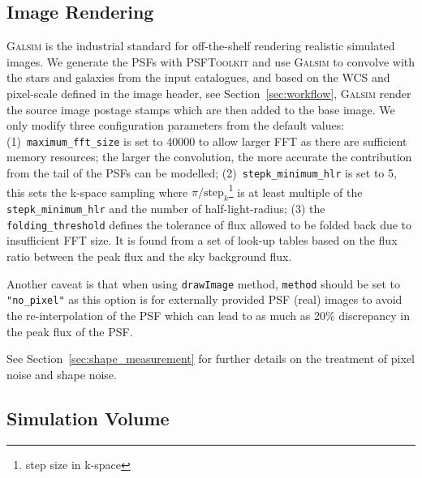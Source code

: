 \documentclass[11pt]{EuclidVIS}
\numberwithin{table}{section}
\numberwithin{figure}{section}
\begin{document}
\subsection{Image Rendering}
\textsc{Galsim} is the industrial standard for off-the-shelf rendering realistic simulated images.
We generate the PSFs with \textsc{PSFToolkit} and use \textsc{Galsim} to convolve with the stars
and galaxies from the input catalogues, and based on the WCS and pixel-scale defined in the image
header, see Section~\ref{sec:workflow}, \textsc{Galsim} render the source image postage stamps
which are then added to the base image. We only modify three configuration parameters from the
default values: (1)~\texttt{maximum\_fft\_size} is set to 40000 to allow larger FFT as there are
sufficient memory resources; the larger the convolution, the more accurate the contribution from
the tail of the PSFs can be modelled; (2)~\texttt{stepk\_minimum\_hlr} is set to 5, this sets the
k-space sampling where $\pi / \mathrm{step}_{k}$\footnote{step size in k-space} is at least multiple
of the \texttt{stepk\_minimum\_hlr} and the number of half-light-radius; (3) the 
\texttt{folding\_threshold} defines the tolerance of flux allowed to be folded back due to
insufficient FFT size. It is found from a set of look-up tables based on the flux ratio between the
peak flux and the sky background flux.

Another caveat is that when using \texttt{drawImage} method, \texttt{method} should be set to 
\texttt{"no\_pixel"} as this option is for externally provided PSF (real) images to avoid the
re-interpolation of the PSF which can lead to as much as 20\% discrepancy in the peak flux
of the PSF.

See Section~\ref{sec:shape_measurement} for further details on the treatment of pixel noise
and shape noise.
            
\subsection{Simulation Volume}

\end{document}
